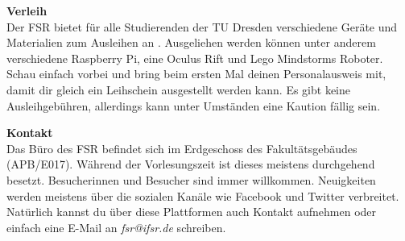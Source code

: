 \textbf{Verleih} \\
Der FSR bietet für alle Studierenden der TU Dresden verschiedene Geräte und Materialien zum Ausleihen an . 
Ausgeliehen werden können unter anderem verschiedene Raspberry Pi, eine Oculus Rift und Lego Mindstorms Roboter.
Schau einfach vorbei und bring beim ersten Mal deinen Personalausweis mit, damit dir gleich ein Leihschein ausgestellt werden kann. 
Es gibt keine Ausleihgebühren, allerdings kann unter Umständen eine Kaution fällig sein.

\textbf{Kontakt} \\
Das Büro des FSR befindet sich im Erdgeschoss des Fakultätsgebäudes (APB/E017). Während der Vorlesungszeit ist dieses meistens durchgehend besetzt. Besucherinnen und Besucher sind immer willkommen. Neuigkeiten werden meistens über die sozialen Kanäle wie Facebook  und Twitter  verbreitet. Natürlich kannst du über diese Plattformen auch Kontakt aufnehmen oder einfach eine E-Mail an \textit{fsr@ifsr.de} schreiben.

\newpage
\mbox{}
\thispagestyle{empty}

